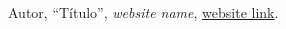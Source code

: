 \documentclass[12pt]{article}
\begin{document}
\setcounter{section}{0}
\setcounter{subsection}{0}


\newpage

\appendixpage
\renewcommand{\thesubsection}{\Alph{subsection}}


\newpage

\begin{thebibliography}{99}
	
	Autor,
	``Título'',
	\textit{website name},
	\url{website link}.
	
\end{thebibliography}
\end{document}
